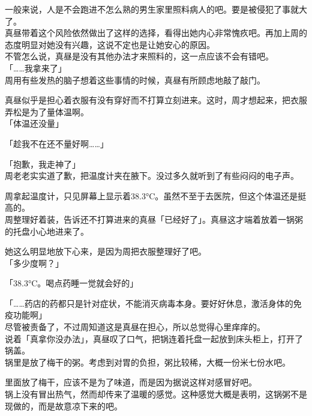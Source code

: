 一般来说，人是不会跑进不怎么熟的男生家里照料病人的吧。要是被侵犯了事就大了。\\

真昼带着这个风险依然做出了这样的选择，看得出她内心非常愧疚吧。再加上周的态度明显对她没有兴趣，这说不定也是让她安心的原因。\\

不管怎么说，真昼是没有其他办法才来照料的，这一点应该不会有错吧。\\

「……我拿来了」\\

周用有些发热的脑子想着这些事情的时候，真昼有所顾虑地敲了敲门。

真昼似乎是担心着衣服有没有穿好而不打算立刻进来。这时，周才想起来，把衣服弄松是为了量体温啊。\\

「体温还没量」

「趁我不在还不量好啊……」

「抱歉，我走神了」\\

周老老实实道了歉，把温度计夹在腋下。没过多久就听到了有些闷闷的电子声。

周拿起温度计，只见屏幕上显示着38.3°C。虽然不至于去医院，但这个体温还是挺高的。\\

周整理好着装，告诉还不打算进来的真昼「已经好了」。真昼这才端着放着一锅粥的托盘小心地进来了。

她这么明显地放下心来，是因为周把衣服整理好了吧。\\

「多少度啊？」

「38.3°C。喝点药睡一觉就会好的」

「……药店的药都只是针对症状，不能消灭病毒本身。要好好休息，激活身体的免疫功能啊」\\

尽管被责备了，不过周知道这是真昼在担心，所以总觉得心里痒痒的。\\

说着「真拿你没办法」，真昼叹了口气，把锅连着托盘一起放到床头柜上，打开了锅盖。\\

锅里是放了梅干的粥。考虑到对胃的负担，粥比较稀，大概一份米七份水吧。

里面放了梅干，应该不是为了味道，而是因为据说这样对感冒好吧。\\

锅上没有冒出热气，然而却传来了温暖的感觉。这种感觉大概是表明，这锅粥不是现做的，而是故意凉下来的吧。\\

